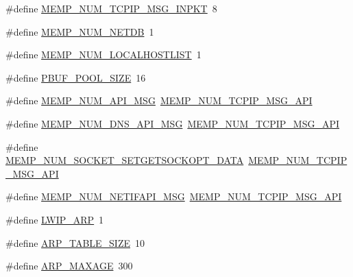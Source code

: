 \begin{DoxyCompactItemize}
\item 
\#define \hyperlink{group__lwip__opts__memp_gab089a7088439e726c3801ba9e249d831}{M\+E\+M\+P\+\_\+\+N\+U\+M\+\_\+\+T\+C\+P\+I\+P\+\_\+\+M\+S\+G\+\_\+\+I\+N\+P\+KT}~8
\item 
\#define \hyperlink{group__lwip__opts__memp_ga293bc22b60bf3f8e2520f60a88370e7a}{M\+E\+M\+P\+\_\+\+N\+U\+M\+\_\+\+N\+E\+T\+DB}~1
\item 
\#define \hyperlink{group__lwip__opts__memp_gaa9b0f949da12cbe8fe5f7aefc30290e0}{M\+E\+M\+P\+\_\+\+N\+U\+M\+\_\+\+L\+O\+C\+A\+L\+H\+O\+S\+T\+L\+I\+ST}~1
\item 
\#define \hyperlink{group__lwip__opts__memp_ga50eaadc4cad0716410332691e382c38a}{P\+B\+U\+F\+\_\+\+P\+O\+O\+L\+\_\+\+S\+I\+ZE}~16
\item 
\#define \hyperlink{group__lwip__opts__memp_ga5a95abf3610c56e7c23cb035eb9c3444}{M\+E\+M\+P\+\_\+\+N\+U\+M\+\_\+\+A\+P\+I\+\_\+\+M\+SG}~\hyperlink{group__lwip__opts__memp_gafbbfd6ce8536038cd00fa85bebae987c}{M\+E\+M\+P\+\_\+\+N\+U\+M\+\_\+\+T\+C\+P\+I\+P\+\_\+\+M\+S\+G\+\_\+\+A\+PI}
\item 
\#define \hyperlink{group__lwip__opts__memp_ga3b1f228c598529c62895ad04ff294980}{M\+E\+M\+P\+\_\+\+N\+U\+M\+\_\+\+D\+N\+S\+\_\+\+A\+P\+I\+\_\+\+M\+SG}~\hyperlink{group__lwip__opts__memp_gafbbfd6ce8536038cd00fa85bebae987c}{M\+E\+M\+P\+\_\+\+N\+U\+M\+\_\+\+T\+C\+P\+I\+P\+\_\+\+M\+S\+G\+\_\+\+A\+PI}
\item 
\#define \hyperlink{group__lwip__opts__memp_gacf9782dd26bf8a655044dc041a9de948}{M\+E\+M\+P\+\_\+\+N\+U\+M\+\_\+\+S\+O\+C\+K\+E\+T\+\_\+\+S\+E\+T\+G\+E\+T\+S\+O\+C\+K\+O\+P\+T\+\_\+\+D\+A\+TA}~\hyperlink{group__lwip__opts__memp_gafbbfd6ce8536038cd00fa85bebae987c}{M\+E\+M\+P\+\_\+\+N\+U\+M\+\_\+\+T\+C\+P\+I\+P\+\_\+\+M\+S\+G\+\_\+\+A\+PI}
\item 
\#define \hyperlink{group__lwip__opts__memp_gadd5a973b98068ce9318ea2f96b5fa14c}{M\+E\+M\+P\+\_\+\+N\+U\+M\+\_\+\+N\+E\+T\+I\+F\+A\+P\+I\+\_\+\+M\+SG}~\hyperlink{group__lwip__opts__memp_gafbbfd6ce8536038cd00fa85bebae987c}{M\+E\+M\+P\+\_\+\+N\+U\+M\+\_\+\+T\+C\+P\+I\+P\+\_\+\+M\+S\+G\+\_\+\+A\+PI}
\item 
\#define \hyperlink{group__lwip__opts__arp_ga9609a014bba4638cc191d6a8f9556c87}{L\+W\+I\+P\+\_\+\+A\+RP}~1
\item 
\#define \hyperlink{group__lwip__opts__arp_ga924936a814564dbdb0bc950d255a83b9}{A\+R\+P\+\_\+\+T\+A\+B\+L\+E\+\_\+\+S\+I\+ZE}~10
\item 
\#define \hyperlink{group__lwip__opts__arp_ga741a0710dc126ed3ae9e305472df3432}{A\+R\+P\+\_\+\+M\+A\+X\+A\+GE}~300

\end{DoxyCompactItemize}
